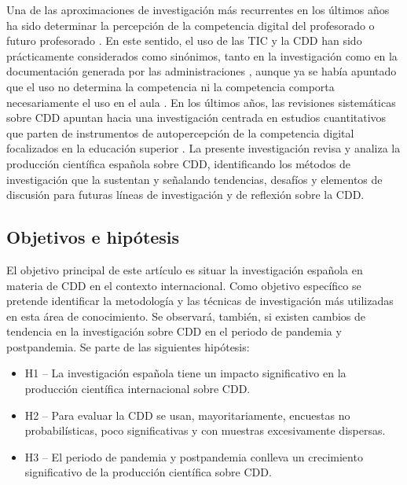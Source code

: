 \documentclass[spanish]{textolivre}
\begin{document}
Una de las aproximaciones de investigación más recurrentes en los últimos años ha sido determinar la percepción de la competencia digital del profesorado o futuro profesorado \cite{alvarez2015, barragan2021, carrera2012, domingocoscollola2020, ramirez2012}. En este sentido, el uso de las TIC y la CDD han sido prácticamente considerados como sinónimos, tanto en la investigación como en la documentación generada por las administraciones \cite{carrera2012, generalitat2018}, aunque ya se había apuntado que el uso no determina la competencia ni la competencia comporta necesariamente el uso en el aula \cite{ramirez2012}. En los últimos años, las revisiones sistemáticas sobre CDD apuntan hacia una investigación centrada en estudios cuantitativos que parten de instrumentos de autopercepción de la competencia digital focalizados en la educación superior \cite{barragan2021, colasbravo2021, fernandezbatanero2021, zhao2021, peters2022}. La presente investigación revisa y analiza la producción científica española sobre CDD, identificando los métodos de investigación que la sustentan y señalando tendencias, desafíos y elementos de discusión para futuras líneas de investigación y de reflexión sobre la CDD.

\subsection{Objetivos e hipótesis}\label{sec-1.4}
El objetivo principal de este artículo es situar la investigación española en materia de CDD en el contexto internacional. Como objetivo específico se pretende identificar la metodología y las técnicas de investigación más utilizadas en esta área de conocimiento. Se observará, también, si existen cambios de tendencia en la investigación sobre CDD en el periodo de pandemia y postpandemia. Se parte de las siguientes hipótesis:

\begin{itemize}
    \item H1 -- La investigación española tiene un impacto significativo en la producción científica internacional sobre CDD.
    \item H2 -- Para evaluar la CDD se usan, mayoritariamente, encuestas no probabilísticas, poco significativas y con muestras excesivamente dispersas.
    \item H3 -- El periodo de pandemia y postpandemia conlleva un crecimiento significativo de la producción científica sobre CDD.
\end{itemize}
\end{document}
